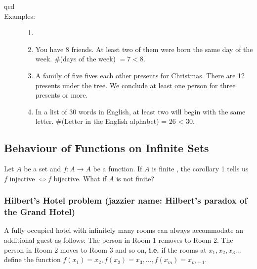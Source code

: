 \documentclass[10pt]{article}
\begin{document}
\begin{description}
		\item[qed]
		\item[Examples:]
		\begin{enumerate}
			\item[]
			\item You have 8 friends. At least two of them were born the same day of the week. \#(days of the week) $= 7 < 8$.
			\item A family of five fives each other presents for Christmas. There are 12 presents under the tree. We conclude at least one person for three presents or more.
			\item In a list of 30 words in English, at least two will begin with the same letter. \#(Letter in the English alphabet) = 26 < 30.
		\end{enumerate}
	\end{description}
	
	\subsection{Behaviour of Functions on Infinite Sets}
	Let $A$ be a set and $f:A \rightarrow A$ be a function. If $A$ is finite , the corollary 1 tells us $f$ injective $\Leftrightarrow f$ bijective. What if $A$ is not finite?
	
	\subsubsection{Hilbert's Hotel problem (jazzier name: Hilbert's paradox of the Grand Hotel)}
	A fully occupied hotel with infinitely many rooms can always accommodate an additional guest as follows: The person in Room 1 removes to Room 2. The person in Room 2 moves to Room 3 and so on, \textbf{i.e.} if the rooms at $x_1, x_2, x_3...$ define the function $f(x_1)=x_2, f(x_2)=x_3, ..., f(x_m) = x_{m+1}$.
	
\end{document}
